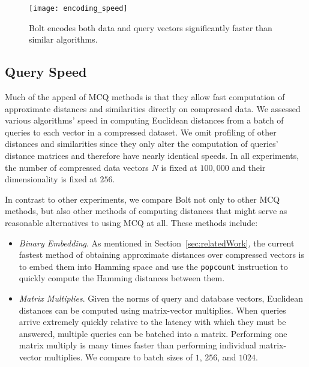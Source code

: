 \begin{figure}[h]
\begin{center}
\texttt{[image: encoding\_speed]}
\vspace*{-1mm}
\caption{Bolt encodes both data and query vectors significantly faster than similar algorithms.}
\label{fig:encoding_speeds}
\end{center}
\end{figure}


\vspace{-2mm}
\subsection{Query Speed}

Much of the appeal of MCQ methods is that they allow fast computation of approximate distances and similarities directly on compressed data. We assessed various algorithms' speed in computing Euclidean distances from a batch of queries to each vector in a compressed dataset. We omit profiling of other distances and similarities since they only alter the computation of queries' distance matrices and therefore have nearly identical speeds. In all experiments, the number of compressed data vectors $N$ is fixed at $100,000$ and their dimensionality is fixed at $256$.

In contrast to other experiments, we compare Bolt not only to other MCQ methods, but also other methods of computing distances that might serve as reasonable alternatives to using MCQ at all. These methods include:
\begin{itemize}[leftmargin=4mm]
    \item \textit{Binary Embedding}. As mentioned in Section~\ref{sec:relatedWork}, the current fastest method of obtaining approximate distances over compressed vectors is to embed them into Hamming space and use the \texttt{popcount} instruction to quickly compute the Hamming distances between them.
    \item \textit{Matrix Multiplies}. Given the norms of query and database vectors, Euclidean distances can be computed using matrix-vector multiplies. When queries arrive extremely quickly relative to the latency with which they must be answered, multiple queries can be batched into a matrix. Performing one matrix multiply is many times faster than performing individual matrix-vector multiplies. We compare to batch sizes of $1$, $256$, and $1024$.
\end{itemize}

